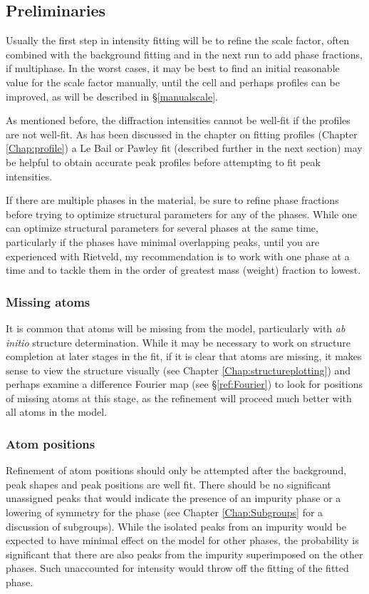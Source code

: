 \subsection{Preliminaries}
Usually the first step in intensity fitting will be to refine the scale factor, often combined with the background fitting and in the next run to add phase fractions, if multiphase. In the worst cases, it may be best to find an initial reasonable value for the scale factor manually, until the cell and perhaps profiles can be improved, as will be described in \S\ref{manualscale}. 

As mentioned before, the diffraction intensities cannot be well-fit if the profiles are not well-fit. As has been discussed in the chapter on fitting profiles (Chapter \ref{Chap:profile}) a Le Bail or Pawley fit (described further in the next section) may be helpful to obtain accurate peak profiles before attempting to fit peak intensities. 

If there are multiple phases in the material, be sure to refine phase fractions before trying to optimize structural parameters for any of the phases. While one can optimize structural parameters for several phases at the same time, particularly if the phases have minimal overlapping peaks, until you are experienced with Rietveld, my recommendation is to work with one phase at a time and to tackle them in the order of greatest mass (weight) fraction to lowest. 

\subsubsection{Missing atoms}
It is common that atoms will be missing from the model, particularly with \textit{ab initio} structure determination. While it may be necessary to work on structure completion at later stages in the fit, if it is clear that atoms are missing, it makes sense to view the structure visually (see Chapter \ref{Chap:structureplotting}) and perhaps examine a difference Fourier map (see \S\ref{ref:Fourier}) to look for positions of missing atoms at this stage, as the refinement will proceed much better with all atoms in the model.

\subsubsection{Atom positions}
Refinement of atom positions should only be attempted after the background, peak shapes and peak positions are well fit. There should be no significant unassigned peaks that would indicate the presence of an impurity phase or a lowering of symmetry for the phase (see Chapter \ref{Chap:Subgroups} for a discussion of subgroups). While the isolated peaks from an impurity would be expected to have minimal effect on the model for other phases, the probability is significant that there are also peaks from the impurity superimposed on the other phases. Such unaccounted for intensity would throw off the fitting of the fitted phase. 

